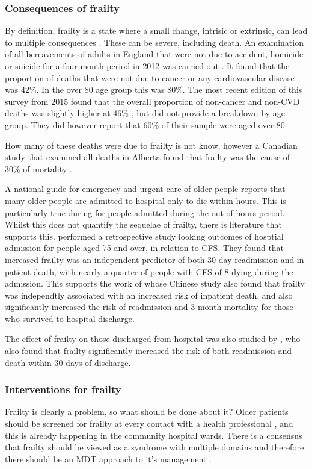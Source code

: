\documentclass[12pt,a4paper,oneside,titlepage]{article}
\begin{document}
\subsubsection*{Consequences of frailty}

By definition, frailty is a state where a small change, intrisic or extrinsic, can
lead to multiple consequences \parencite{collard:12}. These can be severe, including 
death. An examination
of all bereavements of adults in England that were not due to accident, homicide or suicide for 
a four month period in 2012 was 
carried out \parencite{ons:13}. It found that the proportion of deaths
that were not due to cancer or any cardiovascular disease was 42\%. In the over 80
age group this was 80\%. The most recent edition of this survey from 2015 found
that the overall proportion of non-cancer and non-CVD deaths was slightly higher 
at 46\% \parencite{ons:16}, but did not provide a breakdown by age group. They 
did however report that 60\% of their sample were aged over 80.

How many of these deaths were due to frailty is not know, however 
a Canadian study that examined all deaths in Alberta found that frailty was the
cause of 30\% of mortality \parencite{fassbender:09}.

A national guide for emergency and urgent care of older people \parencite{silver:12}
reports that many older people are admitted to hospital only to die within hours.
This is particularly true during for people admitted during the out of hours period.
Whilst this does not quantify the sequelae of frailty, there is literature that 
supports this. \textcite{wallis:15} performed a retrospective study looking 
outcomes of hosptial admission for people aged 75 and over, in relation to CFS. 
They found that increased frailty was an independent predictor of both 30-day
readmission and in-patient death, with nearly a quarter of people with CFS of 8 dying 
during the admission. This supports the work of \textcite{kang:15} whose Chinese 
study also found that frailty was independtly associated with an increased risk of 
inpatient death, and also significantly increased the risk of readmission and 
3-month mortality for those who survived to hospital discharge.

The effect of frailty on those discharged from hospital was also studied by 
\parencite{kahlon:15}, who also found that frailty significantly increased the 
risk of both readmission and death within 30 days of discharge.

\subsubsection*{Interventions for frailty}
Frailty is clearly a problem, so what should be done about it? Older patients 
should be screened for frailty at every contact with a health professional 
\parencite{bgs:14}, and 
this is already happening in the community hospital wards. There is a consensus that 
frailty should be viewed as a syndrome with multiple domains and therefore
there should be an MDT approach to it's management \parencite{vellas:16}.
\end{document}

